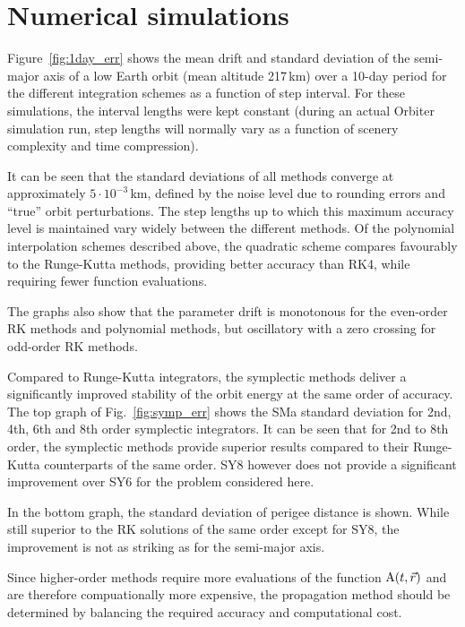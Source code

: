 \documentclass[a4paper]{article}
\begin{document}
\section{Numerical simulations}\label{sec:results}
Figure~\ref{fig:1day_err} shows the mean drift and standard deviation of the semi-major axis of a low Earth orbit (mean altitude 217\,km) over a 10-day period for the different integration schemes as a function of step interval. For these simulations, the interval lengths were kept constant (during an actual Orbiter simulation run, step lengths will normally vary as a function of scenery complexity and time compression).

It can be seen that the standard deviations of all methods converge at approximately $5\cdot 10^{-3}$\,km, defined by the noise level due to rounding errors and ``true'' orbit perturbations. The step lengths up to which this maximum accuracy level is maintained vary widely between the different methods. Of the polynomial interpolation schemes described above, the quadratic scheme compares favourably to the Runge-Kutta methods, providing better accuracy than RK4, while requiring fewer function evaluations.

The graphs also show that the parameter drift is monotonous for the even-order RK methods and polynomial methods, but oscillatory with a zero crossing for odd-order RK methods.

Compared to Runge-Kutta integrators, the symplectic methods deliver a significantly improved stability of the orbit energy at the same order of accuracy. The top graph of Fig.~\ref{fig:symp_err} shows the SMa standard deviation for 2nd, 4th, 6th and 8th order symplectic integrators. It can be seen that for 2nd to 8th order, the symplectic methods provide superior results compared to their Runge-Kutta counterparts of the same order. SY8 however does not provide a significant improvement over SY6 for the problem considered here. 

In the bottom graph, the standard deviation of perigee distance is shown. While still superior to the RK solutions of the same order except for SY8, the improvement is not as striking as for the semi-major axis.

Since higher-order methods require more evaluations of the function $\mathrm{A}(t,\vec{r})$ and are therefore compuationally more expensive, the propagation method should be determined by balancing the required accuracy and computational cost. 
\end{document}
